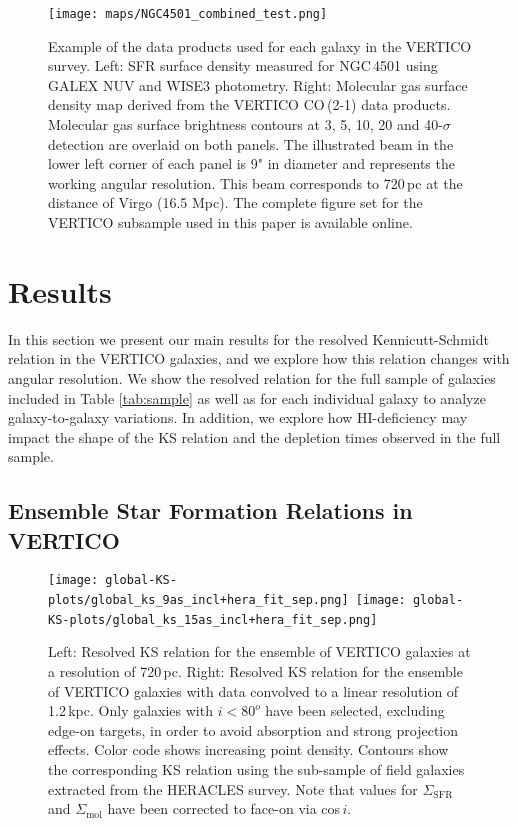 \documentclass[longauth]{aa}
\begin{document}
\begin{figure*}
\centering
\texttt{[image: maps/NGC4501\_combined\_test.png]}

\caption{Example of the data products used for each galaxy in the VERTICO survey. Left: SFR surface density measured for NGC\,4501 using GALEX NUV and WISE3 photometry. Right: Molecular gas surface density map derived from the VERTICO CO\,(2-1) data products. Molecular gas surface brightness contours at 3, 5, 10, 20 and 40-$\sigma$ detection are overlaid on both panels. The illustrated beam in the lower left corner of each panel is 9" in diameter and represents the working angular resolution. This beam corresponds to 720\,pc at the distance of Virgo (16.5 Mpc). The complete figure set for the VERTICO subsample used in this paper is available online.
}
\label{fig:products}
\end{figure*}



\section{Results}
\label{sec:results}
In this section we present our main results for the resolved Kennicutt-Schmidt relation in the VERTICO galaxies, and we explore how this relation changes with angular resolution. We show the resolved relation for the full sample of galaxies included in Table \ref{tab:sample} as well as for each individual galaxy to analyze galaxy-to-galaxy variations. In addition, we explore how HI-deficiency may impact the shape of the KS relation and the depletion times observed in the full sample.

\subsection{Ensemble Star Formation Relations in VERTICO}
\label{sec:ensemble}

\begin{figure*}
\centering
\texttt{[image: global-KS-plots/global\_ks\_9as\_incl+hera\_fit\_sep.png]}\,
\texttt{[image: global-KS-plots/global\_ks\_15as\_incl+hera\_fit\_sep.png]}\,
\caption{Left: Resolved KS relation for the ensemble of VERTICO galaxies at a resolution of 720\,pc. Right: Resolved KS relation for the ensemble of VERTICO galaxies with data convolved to a linear resolution of 1.2\,kpc. Only galaxies with $i<80^o$ have been selected, excluding edge-on targets, in order to avoid absorption and strong projection effects. Color code shows increasing point density. Contours show the corresponding KS relation using the sub-sample of field galaxies extracted from the HERACLES survey. Note that values for $\Sigma_\textrm{SFR}$ and $\Sigma_\textrm{mol}$ have been corrected to face-on via cos\,$i$.
}
\label{fig:global-ks-inc}
\end{figure*}
\end{document}
